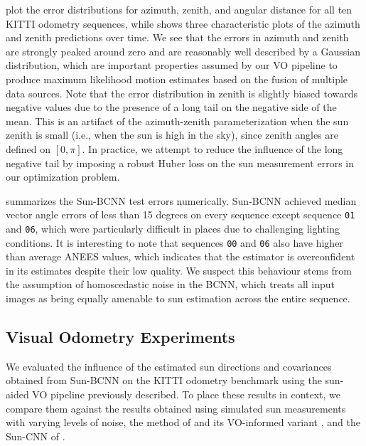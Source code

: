  plot the error distributions for azimuth, zenith, and angular distance for all ten KITTI odometry sequences, while  shows three characteristic plots of the azimuth and zenith predictions over time. 
We see that the errors in azimuth and zenith are strongly peaked around zero and are reasonably well described by a Gaussian distribution, which are important properties assumed by our VO pipeline to produce maximum likelihood motion estimates based on the fusion of multiple data sources.
Note that the error distribution in zenith is slightly biased towards negative values due to the presence of a long tail on the negative side of the mean.
This is an artifact of the azimuth-zenith parameterization when the sun zenith is small (i.e., when the sun is high in the sky), since zenith angles are defined on $[0,\pi]$.
In practice, we attempt to reduce the influence of the long negative tail by imposing a robust Huber loss on the sun measurement errors in our optimization problem.

 summarizes the Sun-BCNN test errors numerically.
Sun-BCNN achieved median vector angle errors of less than 15 degrees on every sequence except sequence \texttt{01} and \texttt{06}, which were particularly difficult in places due to challenging lighting conditions.
It is interesting to note that sequences \texttt{00} and \texttt{06} also have higher than average ANEES values, which indicates that the estimator is overconfident in its estimates despite their low quality.
We suspect this behaviour stems from the assumption of homoscedastic noise in the BCNN, which treats all input images as being equally amenable to sun estimation across the entire sequence.

\subsection{Visual Odometry Experiments}
We evaluated the influence of the estimated sun directions and covariances obtained from Sun-BCNN on the KITTI odometry benchmark using the sun-aided VO pipeline previously described.
To place these results in context, we compare them against the results obtained using simulated sun measurements with varying levels of noise, the method of \citet{Lalonde2011-jw} and its VO-informed variant \citep{2017_Clement_Improving}, and the Sun-CNN of \citet{Ma2016-at}.

